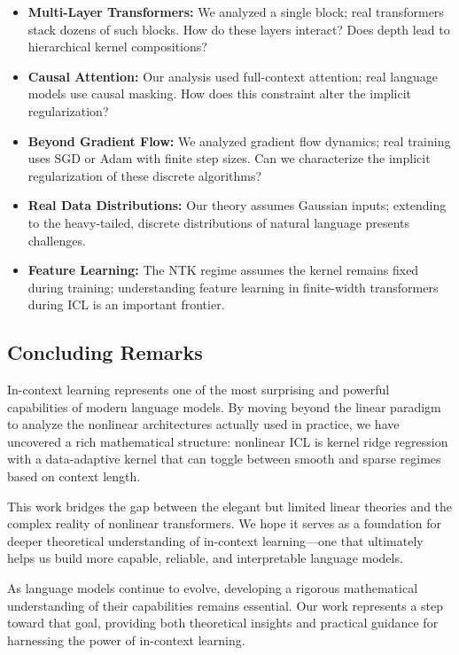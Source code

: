	\begin{itemize}
		\item \textbf{Multi-Layer Transformers:} We analyzed a single block; real transformers stack dozens of such blocks. How do these layers interact? Does depth lead to hierarchical kernel compositions?
		\item \textbf{Causal Attention:} Our analysis used full-context attention; real language models use causal masking. How does this constraint alter the implicit regularization?
		\item \textbf{Beyond Gradient Flow:} We analyzed gradient flow dynamics; real training uses SGD or Adam with finite step sizes. Can we characterize the implicit regularization of these discrete algorithms?
		\item \textbf{Real Data Distributions:} Our theory assumes Gaussian inputs; extending to the heavy-tailed, discrete distributions of natural language presents challenges.
		\item \textbf{Feature Learning:} The NTK regime assumes the kernel remains fixed during training; understanding feature learning in finite-width transformers during ICL is an important frontier.
	\end{itemize}
	
	\subsection{Concluding Remarks}
	
	In-context learning represents one of the most surprising and powerful capabilities of modern language models. By moving beyond the linear paradigm to analyze the nonlinear architectures actually used in practice, we have uncovered a rich mathematical structure: nonlinear ICL is kernel ridge regression with a data-adaptive kernel that can toggle between smooth and sparse regimes based on context length.
	
	This work bridges the gap between the elegant but limited linear theories and the complex reality of nonlinear transformers. We hope it serves as a foundation for deeper theoretical understanding of in-context learning—one that ultimately helps us build more capable, reliable, and interpretable language models.
	
	As language models continue to evolve, developing a rigorous mathematical understanding of their capabilities remains essential. Our work represents a step toward that goal, providing both theoretical insights and practical guidance for harnessing the power of in-context learning.
	